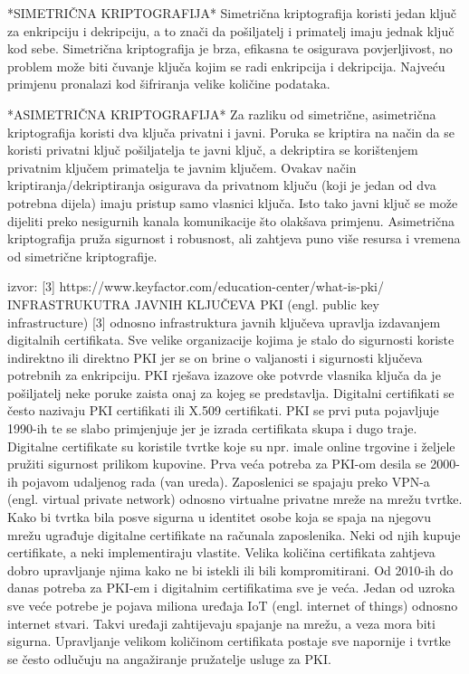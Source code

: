 \documentclass[]{foi}
\begin{document}
*SIMETRIČNA KRIPTOGRAFIJA*
Simetrična kriptografija koristi jedan ključ za enkripciju i dekripciju, a to znači da pošiljatelj i primatelj imaju jednak ključ kod sebe.
Simetrična kriptografija je brza, efikasna te osigurava povjerljivost, no problem može biti čuvanje ključa kojim se radi enkripcija i dekripcija.
Najveću primjenu pronalazi kod šifriranja velike količine podataka.

*ASIMETRIČNA KRIPTOGRAFIJA*
Za razliku od simetrične, asimetrična kriptografija koristi dva ključa privatni i javni. 
Poruka se kriptira na način da se koristi privatni ključ pošiljatelja te javni ključ, a dekriptira se korištenjem privatnim ključem primatelja te javnim ključem.
Ovakav način kriptiranja/dekriptiranja osigurava da privatnom ključu (koji je jedan od dva potrebna dijela) imaju pristup samo vlasnici ključa.
Isto tako javni ključ se može dijeliti preko nesigurnih kanala komunikacije što olakšava primjenu.
Asimetrična kriptografija pruža sigurnost i robusnost, ali zahtjeva puno više resursa i vremena od simetrične kriptografije. 

izvor: [3] https://www.keyfactor.com/education-center/what-is-pki/
INFRASTRUKUTRA JAVNIH KLJUČEVA
PKI (engl. public key infrastructure) [3] odnosno infrastruktura javnih ključeva upravlja izdavanjem digitalnih certifikata.
Sve velike organizacije kojima je stalo do sigurnosti koriste indirektno ili direktno PKI jer se on brine o valjanosti i sigurnosti ključeva potrebnih za enkripciju.
PKI rješava izazove oke potvrde vlasnika ključa da je pošiljatelj neke poruke zaista onaj za kojeg se predstavlja. 
Digitalni certifikati se često nazivaju PKI certifikati ili X.509 certifikati.
PKI se prvi puta pojavljuje 1990-ih te se slabo primjenjuje jer je izrada certifikata skupa i dugo traje. 
Digitalne certifikate su koristile tvrtke koje su npr. imale online trgovine i željele pružiti sigurnost prilikom kupovine.
Prva veća potreba za PKI-om desila se 2000-ih pojavom udaljenog rada (van ureda). 
Zaposlenici se spajaju preko VPN-a (engl. virtual private network) odnosno virtualne privatne mreže na mrežu tvrtke.
Kako bi tvrtka bila posve sigurna u identitet osobe koja se spaja na njegovu mrežu ugrađuje digitalne certifikate na računala zaposlenika.
Neki od njih kupuje certifikate, a neki implementiraju vlastite. 
Velika količina certifikata zahtjeva dobro upravljanje njima kako ne bi istekli ili bili kompromitirani.
Od 2010-ih do danas potreba za PKI-em i digitalnim certifikatima sve je veća.
Jedan od uzroka sve veće potrebe je pojava miliona uređaja IoT (engl. internet of things) odnosno internet stvari.
Takvi uređaji zahtijevaju spajanje na mrežu, a veza mora biti sigurna. 
Upravljanje velikom količinom certifikata postaje sve napornije i tvrtke se često odlučuju na angažiranje pružatelje usluge za PKI.
\end{document}
